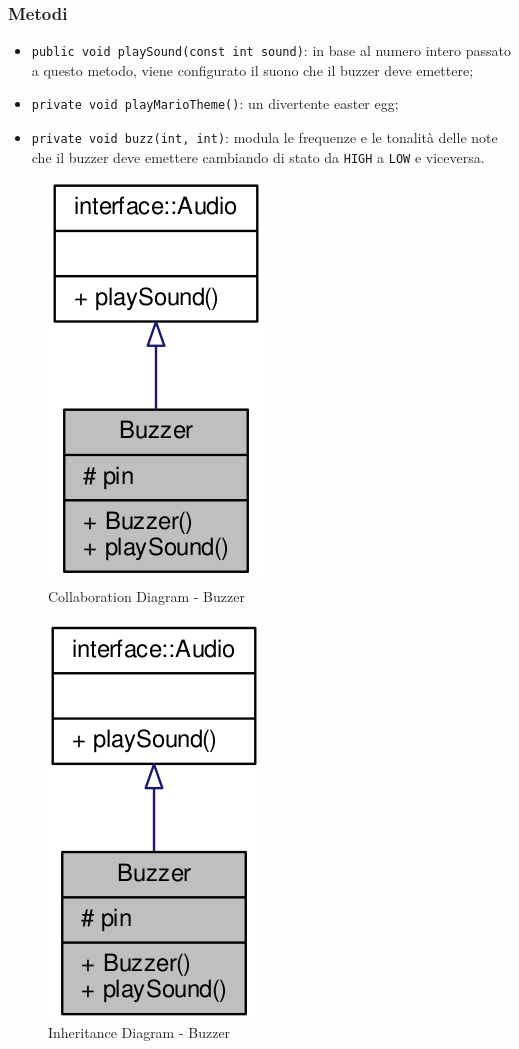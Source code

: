 \subsubsection{Metodi}
\begin{itemize}
	\item \texttt{public void playSound(const int sound)}: in base al numero intero passato a questo metodo, viene configurato il suono che il buzzer deve emettere;
	\item \texttt{private void playMarioTheme()}: un divertente easter egg;
	\item \texttt{private void buzz(int, int)}: modula le frequenze e le tonalità delle note che il buzzer deve emettere cambiando di stato da \texttt{HIGH} a \texttt{LOW} e viceversa.
\end{itemize}
\begin{figure}[!ht]
	\centering
	\includegraphics[scale=.35]{img/UML/CollaborationDiagram/Buzzer.png}
	\caption{Collaboration Diagram - Buzzer}
\end{figure}
\begin{figure}[!ht]
	\centering
	\includegraphics[scale=.35]{img/UML/InheritanceDiagram/Buzzer.png}
	\caption{Inheritance Diagram - Buzzer}
\end{figure}

